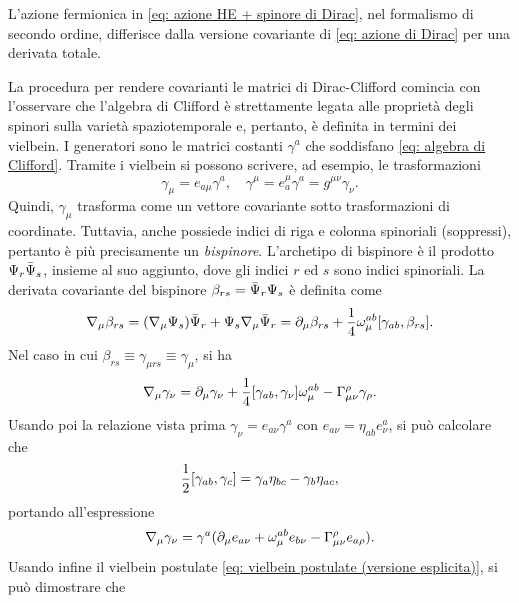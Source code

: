 \begin{obs}
    L'azione fermionica in \eqref{eq: azione HE + spinore di Dirac}, nel formalismo di secondo ordine, differisce dalla versione covariante di \eqref{eq: azione di Dirac} per una derivata totale. 
\end{obs}
La procedura per rendere covarianti le matrici di Dirac-Clifford comincia con l'osservare che l'algebra di Clifford è strettamente legata alle proprietà degli spinori sulla varietà spaziotemporale e, pertanto, è definita in termini dei vielbein. I generatori sono le matrici costanti $\gamma^a$ che soddisfano \eqref{eq: algebra di Clifford}. Tramite i vielbein si possono scrivere, ad esempio, le trasformazioni
\begin{equation}
    \gamma_\mu = e_{a\mu}\gamma^a,\quad \gamma^\mu = e_a^\mu\gamma^a = g^{\mu\nu}\gamma_\nu.
\end{equation}
Quindi, $\gamma_\mu$ trasforma come un vettore covariante sotto trasformazioni di coordinate. Tuttavia, anche possiede indici di riga e colonna spinoriali (soppressi), pertanto è più precisamente un \emph{bispinore}. L'archetipo di bispinore è il prodotto $\Psi_r\bar{\Psi}_s$, insieme al suo aggiunto, dove gli indici $r$ ed $s$ sono indici spinoriali. La derivata covariante del bispinore $\beta_{rs} = \bar{\Psi}_r\Psi_s$ è definita come 
\begin{equation}
    \nabla_\mu\beta_{rs} = (\nabla_\mu\Psi_s)\bar{\Psi}_r + \Psi_s\nabla_\mu\bar{\Psi}_r = \partial_\mu \beta_{rs} + \frac{1}{4}\omega_\mu^{ab}[\gamma_{ab},\beta_{rs}].
\end{equation}
Nel caso in cui $\beta_{rs} \equiv \gamma_{\mu rs} \equiv \gamma_\mu$, si ha 
\begin{equation}
    \nabla_\mu\gamma_\nu = \partial_\mu\gamma_\nu + \frac{1}{4}[\gamma_{ab},\gamma_\nu]\omega_\mu^{ab} - \Gamma_{\mu\nu}^\rho\gamma_\rho.
\end{equation}
Usando poi la relazione vista prima $\gamma_\nu = e_{a\nu}\gamma^a$ con $e_{a\nu} = \eta_{ab}e^a_\nu$, si può calcolare che
\begin{equation}
    \frac{1}{2}[\gamma_{ab},\gamma_c] = \gamma_a\eta_{bc} - \gamma_b\eta_{ac},
\end{equation}
portando all'espressione 
\begin{equation}
    \nabla_\mu\gamma_\nu = \gamma^a(\partial_\mu e_{a\nu} + \omega_\mu^{ab}e_{b\nu} - \Gamma^\rho_{\mu\nu}e_{a\rho}).
\end{equation}
Usando infine il vielbein postulate \eqref{eq: vielbein postulate (versione esplicita)}, si può dimostrare che 
